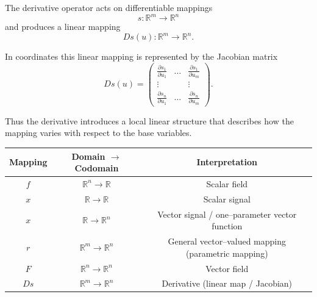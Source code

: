 \documentclass{article}
\begin{document}
	The derivative operator acts on differentiable mappings
	\[
	s : \mathbb{R}^m \to \mathbb{R}^n
	\]
	and produces a linear mapping
	\[
	Ds(u) : \mathbb{R}^m \to \mathbb{R}^n.
	\]
	
	In coordinates this linear mapping is represented by the Jacobian matrix
	\[
	Ds(u) =
	\begin{pmatrix}
		\frac{\partial s_1}{\partial u_1} & \dots & \frac{\partial s_1}{\partial u_m} \\
		\vdots & & \vdots \\
		\frac{\partial s_n}{\partial u_1} & \dots & \frac{\partial s_n}{\partial u_m}
	\end{pmatrix}.
	\]
	
	Thus the derivative introduces a local linear structure that describes how the mapping varies with respect to the base variables.
	
	\begin{center}
		\begin{tabular}{|c|c|c|}
			\hline
			Mapping & Domain $\rightarrow$ Codomain & Interpretation \\
			\hline
			$f$ & $\mathbb{R}^n \rightarrow \mathbb{R}$ & Scalar field \\
			\hline
			$x$ & $\mathbb{R} \rightarrow \mathbb{R}$ & Scalar signal \\
			\hline
			$x$ & $\mathbb{R} \rightarrow \mathbb{R}^n$ & Vector signal / one--parameter vector function \\
			\hline
			$r$ & $\mathbb{R}^m \rightarrow \mathbb{R}^n$ & General vector--valued mapping (parametric mapping) \\
			\hline
			$F$ & $\mathbb{R}^n \rightarrow \mathbb{R}^n$ & Vector field \\
			\hline
			$Ds$ & $\mathbb{R}^m \rightarrow \mathbb{R}^n$ & Derivative (linear map / Jacobian) \\
			\hline
		\end{tabular}
	\end{center}
\end{document}
